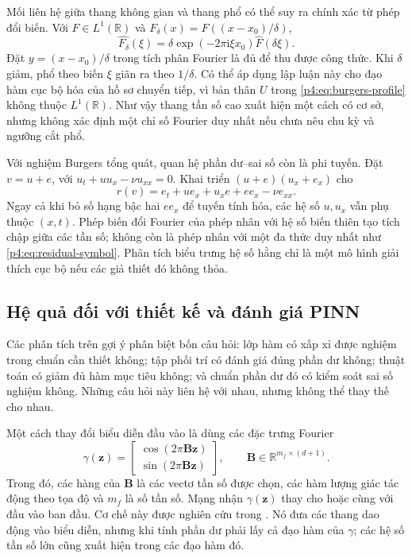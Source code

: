 Mối liên hệ giữa thang không gian và thang phổ có thể suy ra chính
xác từ phép đổi biến. Với $F\in L^1(\mathbb{R})$ và
$F_\delta(x)=F((x-x_0)/\delta)$,
\begin{equation}
 \widehat{F_\delta}(\xi)
 =\delta\exp(-2\pi\mathrm{i}\xi x_0)\widehat F(\delta\xi).
 \label{p4:eq:scaling-fourier}
\end{equation}
Đặt $y=(x-x_0)/\delta$ trong tích phân Fourier là đủ để thu được
công thức. Khi $\delta$ giảm, phổ theo biến $\xi$ giãn ra theo
$1/\delta$. Có thể áp dụng lập luận này cho đạo hàm cục bộ hóa của
hồ sơ chuyển tiếp, vì bản thân $U$ trong \eqref{p4:eq:burgers-profile}
không thuộc $L^1(\mathbb{R})$.
Như vậy thang tần số cao xuất hiện một cách có cơ sở, nhưng không
xác định một chỉ số Fourier duy nhất nếu chưa nêu chu kỳ và ngưỡng
cắt phổ.

Với nghiệm Burgers tổng quát, quan hệ phần dư--sai số còn là phi
tuyến. Đặt $v=u+e$, với $u_t+uu_x-\nu u_{xx}=0$. Khai triển
$(u+e)(u_x+e_x)$ cho
\begin{equation}
 r(v)=e_t+u e_x+u_xe+e e_x-\nu e_{xx}.
 \label{p4:eq:burgers-error}
\end{equation}
Ngay cả khi bỏ số hạng bậc hai $e e_x$ để tuyến tính hóa, các hệ số
$u,u_x$ vẫn phụ thuộc $(x,t)$. Phép biến đổi Fourier của phép nhân
với hệ số biến thiên tạo tích chập giữa các tần số; không còn là
phép nhân với một đa thức duy nhất như
\eqref{p4:eq:residual-symbol}. Phân tích biểu trưng hệ số hằng chỉ là
một mô hình giải thích cục bộ nếu các giả thiết đó không thỏa.

\subsection{Hệ quả đối với thiết kế và đánh giá PINN}

Các phân tích trên gợi ý phân biệt bốn câu hỏi: lớp hàm có xấp xỉ
được nghiệm trong chuẩn cần thiết không; tập phối trí có đánh giá
đúng phần dư không; thuật toán có giảm đủ hàm mục tiêu không; và
chuẩn phần dư đó có kiểm soát sai số nghiệm không. Những câu hỏi này
liên hệ với nhau, nhưng không thể thay thế cho nhau.

Một cách thay đổi biểu diễn đầu vào là dùng các đặc trưng Fourier
\begin{equation}
 \gamma(\mathbf{z})=
 \begin{bmatrix}
 \cos(2\pi\mathbf{B}\mathbf{z})\\
 \sin(2\pi\mathbf{B}\mathbf{z})
 \end{bmatrix},\qquad
 \mathbf{B}\in\mathbb{R}^{m_f\times(d+1)}.
 \label{p4:eq:fourier-features}
\end{equation}
Trong đó, các hàng của $\mathbf{B}$ là các vectơ tần số được chọn,
các hàm lượng giác tác động theo tọa độ và $m_f$ là số tần số.
Mạng nhận $\gamma(\mathbf{z})$ thay cho hoặc cùng với đầu vào ban
đầu. Cơ chế này được nghiên cứu trong \cite{tancik2020}.
Nó đưa các thang dao động vào biểu diễn, nhưng khi tính phần dư phải
lấy cả đạo hàm của $\gamma$; các hệ số tần số lớn cũng xuất hiện
trong các đạo hàm đó.

